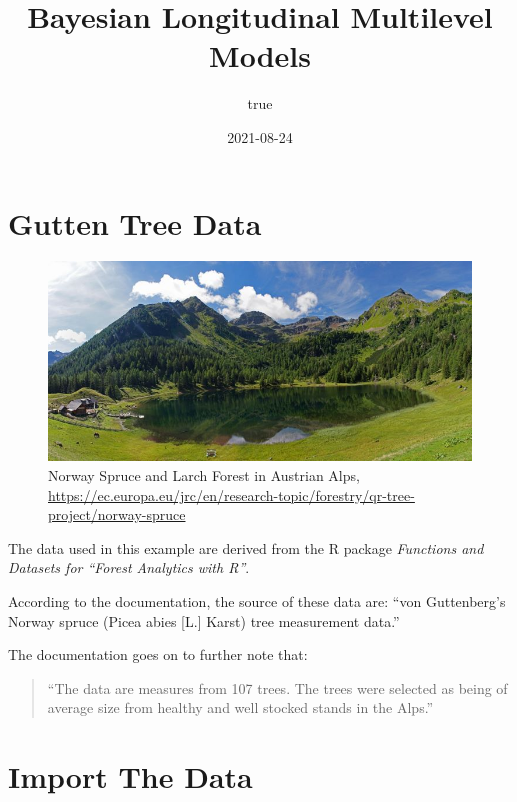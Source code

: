\documentclass[
]{article}
\title{Bayesian Longitudinal Multilevel Models}
\author{true}
\date{2021-08-24}
\begin{document}
\maketitle

{
\setcounter{tocdepth}{2}
\tableofcontents
}
\hypertarget{gutten-tree-data}{%
\section{Gutten Tree Data}\label{gutten-tree-data}}

\begin{figure}
\centering
\includegraphics{fotolia-small.jpg}
\caption{Norway Spruce and Larch Forest in Austrian Alps,
\url{https://ec.europa.eu/jrc/en/research-topic/forestry/qr-tree-project/norway-spruce}}
\end{figure}

The data used in this example are derived from the R package
\emph{Functions and Datasets for ``Forest Analytics with R''}.

According to the documentation, the source of these data are: ``von
Guttenberg's Norway spruce (Picea abies {[}L.{]} Karst) tree measurement
data.''

The documentation goes on to further note that:

\begin{quote}
``The data are measures from 107 trees. The trees were selected as being
of average size from healthy and well stocked stands in the Alps.''
\end{quote}

\hypertarget{import-the-data}{%
\section{Import The Data 🌲}\label{import-the-data}}
\end{document}
